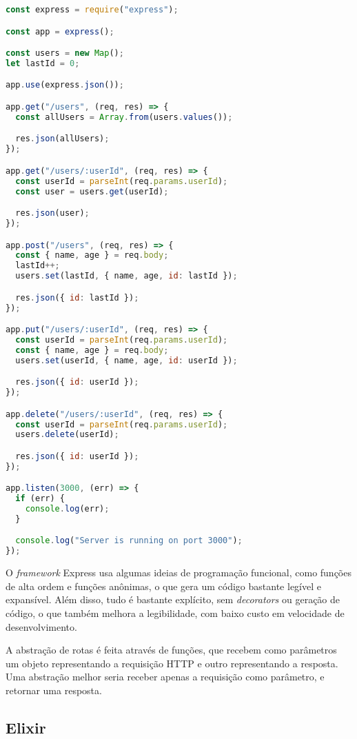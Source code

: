 \begin{lstlisting}[language=Javascript,label={code:nodeapp},caption={Aplicação base em Javascript com Express}]
const express = require("express");

const app = express();

const users = new Map();
let lastId = 0;

app.use(express.json());

app.get("/users", (req, res) => {
  const allUsers = Array.from(users.values());

  res.json(allUsers);
});

app.get("/users/:userId", (req, res) => {
  const userId = parseInt(req.params.userId);
  const user = users.get(userId);

  res.json(user);
});

app.post("/users", (req, res) => {
  const { name, age } = req.body;
  lastId++;
  users.set(lastId, { name, age, id: lastId });

  res.json({ id: lastId });
});

app.put("/users/:userId", (req, res) => {
  const userId = parseInt(req.params.userId);
  const { name, age } = req.body;
  users.set(userId, { name, age, id: userId });

  res.json({ id: userId });
});

app.delete("/users/:userId", (req, res) => {
  const userId = parseInt(req.params.userId);
  users.delete(userId);

  res.json({ id: userId });
});

app.listen(3000, (err) => {
  if (err) {
    console.log(err);
  }

  console.log("Server is running on port 3000");
});
\end{lstlisting}

O \textit{framework} Express usa algumas ideias de programação funcional, como
funções de alta ordem e funções anônimas, o que gera um código bastante legível
e expansível. Além disso, tudo é bastante explícito, sem \textit{decorators} ou
geração de código, o que também melhora a legibilidade, com baixo custo em velocidade
de desenvolvimento.

A abstração de rotas é feita através de funções, que recebem como parâmetros
um objeto representando a requisição HTTP e outro representando a resposta. Uma
abstração melhor seria receber apenas a requisição como parâmetro, e retornar uma
resposta.

\subsection{Elixir}

